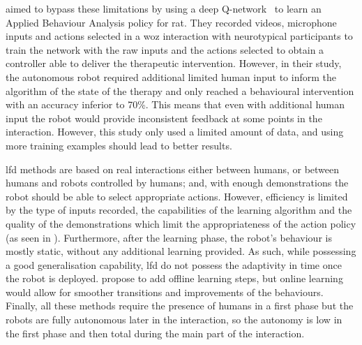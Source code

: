     \cite{clark2018deep} aimed to bypass these limitations by using a deep Q-network~\citep{mnih2015human} to learn an Applied Behaviour Analysis policy for \gls{rat}. They recorded videos, microphone inputs and actions selected in a \gls{woz} interaction with neurotypical participants to train the network with the raw inputs and the actions selected to obtain a controller able to deliver the therapeutic intervention. However, in their study, the autonomous robot required additional limited human input to inform the algorithm of the state of the therapy and only reached a behavioural intervention with an accuracy inferior to 70\%. This means that even with additional human input the robot would provide inconsistent feedback at some points in the interaction. However, this study only used a limited amount of data, and using more training examples should lead to better results.
     
    \gls{lfd} methods are based on real interactions either between humans, or between humans and robots controlled by humans; and, with enough demonstrations the robot should be able to select appropriate actions. However, efficiency is limited by the type of inputs recorded, the capabilities of the learning algorithm and the quality of the demonstrations which limit the appropriateness of the action policy (as seen in \citealt{clark2018deep}). Furthermore, after the learning phase, the robot's behaviour is  mostly static, without any additional learning provided. As such, while possessing a good generalisation capability, \gls{lfd} do not possess the adaptivity in time once the robot is deployed. \cite{sequeira2016discovering} propose to add offline learning steps, but online learning would allow for smoother transitions and improvements of the behaviours.
    Finally, all these methods require the presence of humans in a first phase but the robots are fully autonomous later in the interaction, so the autonomy is low in the first phase and then total during the main part of the interaction.
    
